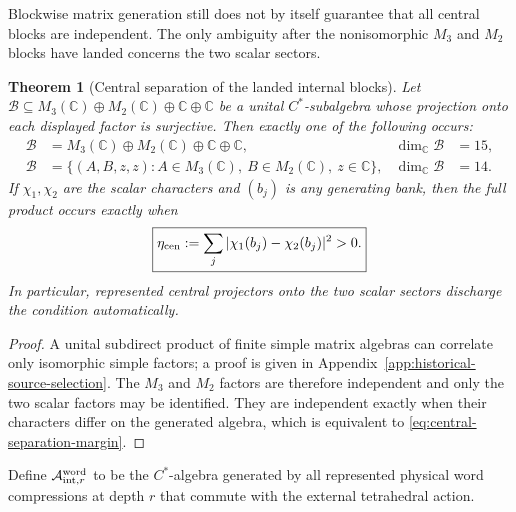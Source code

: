 \documentclass[11pt]{article}
\newtheorem{theorem}{Theorem}[section]
\theoremstyle{definition}
\theoremstyle{remark}
\newcommand{\C}{\mathbb C}
\newcommand{\A}{\mathcal A}
\begin{document}
Blockwise matrix generation still does not by itself guarantee that all
central blocks are independent.  The only ambiguity after the nonisomorphic
$M_3$ and $M_2$ blocks have landed concerns the two scalar sectors.

\begin{theorem}[Central separation of the landed internal blocks]
\label{thm:central-separation}
Let
$\mathcal B\subseteq M_3(\C)\oplus M_2(\C)\oplus\C\oplus\C$
be a unital $C^*$-subalgebra whose projection onto each displayed factor is
surjective.  Then exactly one of the following occurs:
\begin{align}
 \mathcal B&=M_3(\C)\oplus M_2(\C)\oplus\C\oplus\C,
 &\dim_\C\mathcal B&=15,
 \label{eq:central-separated-15}\\
 \mathcal B&=\{(A,B,z,z):A\in M_3(\C),\ B\in M_2(\C),\ z\in\C\},
 &\dim_\C\mathcal B&=14.
 \label{eq:central-locked-14}
\end{align}
If $\chi_1,\chi_2$ are the scalar characters and $(b_j)$ is any generating
bank, then the full product occurs exactly when
\begin{equation}
 \boxed{\eta_{\rm cen}:=\sum_j|\chi_1(b_j)-\chi_2(b_j)|^2>0.}
 \label{eq:central-separation-margin}
\end{equation}
In particular, represented central projectors onto the two scalar sectors
discharge the condition automatically.
\end{theorem}

\begin{proof}
A unital subdirect product of finite simple matrix algebras can correlate only
isomorphic simple factors; a proof is given in
Appendix~\ref{app:historical-source-selection}.  The $M_3$ and $M_2$ factors
are therefore independent and only the two scalar factors may be identified.
They are independent exactly when their characters differ on the generated
algebra, which is equivalent to \eqref{eq:central-separation-margin}.
\end{proof}

Define $\A_{{\rm int},r}^{\rm word}$ to be the $C^*$-algebra generated by
all represented physical word compressions at depth $r$ that commute with the
external tetrahedral action.
\end{document}
